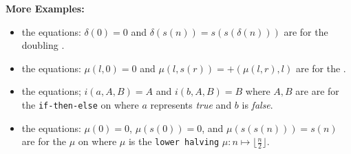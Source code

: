 \textbf{More Examples:}
\begin{itemize}
    \item the equations: $\delta(0) = 0$ and $\delta(s(n)) = s(s(\delta(n)))$ are  for the doubling .
    \item the equations: $\mu(l,0)=0$ and $\mu(l,s(r)) = +(\mu(l,r), l)$ are  for the  .
    \item the equations; $i(a,A,B)=A$ and $i(b,A,B)=B$ where $A,B$ are  are  for the \texttt{if-then-else}  on  where $a$ represents \textit{true} and $b$ is \textit{false}.
    \item the equations: $\mu(0) = 0$, $\mu(s(0)) = 0$, and $\mu(s(s(n))) = s(n)$ are  for the  $\mu$ on  where $\mu$ is the \texttt{lower halving}  $\mu:n \mapsto \lfloor \frac{n}{2} \rfloor $.
\end{itemize}

